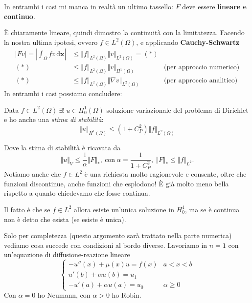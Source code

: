 \documentclass[10pt,a4paper,twoside,openright]{book}
\newcommand{\x}{\mathbf{x}}
\newcommand{\de}{\,\mathrm d}
\newcommand{\dxx}{\de \x}
\begin{document}
In entrambi i casi mi manca in realtà un ultimo tassello: $F$ deve essere \textbf{lineare e continuo}.

È chiaramente lineare, quindi dimostro la continuità con la limitatezza. Facendo la nostra ultima ipotesi, ovvero $\displaystyle f\in L^{2}(\Omega)$, e applicando \textbf{Cauchy-Schwartz}
\begin{align*}
	| Fv| =\left| \int _{\Omega } fv\dxx\right| & \leqslant \Vert f\Vert _{L^{2}(\Omega)}\Vert v\Vert _{L^{2}(\Omega)} =(*)  &                                  \\
	(*)                                                 & \leqslant \Vert f\Vert _{L^{2}(\Omega)}\Vert v\Vert _{H^{1}(\Omega)}        & \text{(per approccio numerico)}  \\
	(*)                                                 & \leqslant \Vert f\Vert _{L^{2}(\Omega)}\Vert \nabla v\Vert _{L^{2}(\Omega)} & \text{(per approccio analitico)} 
\end{align*}
In entrambi i casi possiamo concludere:
\begin{theorem}
	Data $\displaystyle f\in L^{2}(\Omega) \ \exists !\ u\in H_{0}^{1}(\Omega)$ soluzione variazionale del problema di Dirichlet e ho anche una \textit{stima di stabilità}:
	\begin{equation*}
		\Vert u\Vert _{H^{1}(\Omega)} \leqslant \left(1+C_{P}^{2}\right)\Vert f\Vert _{L^{2}(\Omega)}
	\end{equation*}
\end{theorem}
Dove la stima di stabilità è ricavata da
\begin{equation*}
	\Vert u\Vert _{V} \leqslant \frac{1}{\alpha }\Vert F\Vert _{*} ,\ \text{con} \ \alpha =\frac{1}{1+C_{P}^{2}} ,\ \Vert F\Vert _{*} \leqslant \Vert f\Vert _{L^{2}} .
\end{equation*}
Notiamo anche che $\displaystyle f\in L^{2}$ è una richiesta molto ragionevole e consente, oltre che funzioni discontinue, anche funzioni che esplodono! È già molto meno bella rispetto a quanto chiedevamo che fosse continua.

Il fatto è che se $\displaystyle f\in L^{2}$ allora esiste un'unica soluzione in $\displaystyle H_{0}^{1}$, ma se è continua non è detto che esista (se esiste è unica).



Solo per completezza (questo argomento sarà trattato nella parte numerica) vediamo cosa succede con condizioni al bordo diverse. Lavoriamo in $n=1$ con un'equazione di diffusione-reazione lineare
\begin{equation*}
	\begin{cases}
		-u''(x) +\mu (x) u=f(x)    & a< x< b            \\
		u'(b) +\alpha u(b) =u_{1}  &                    \\
		-u'(a) +\alpha u(a) =u_{0} & \alpha \geqslant 0 
	\end{cases}
\end{equation*}
Con $\displaystyle \alpha =0$ ho Neumann, con $\displaystyle \alpha  >0$ ho Robin.
\end{document}
